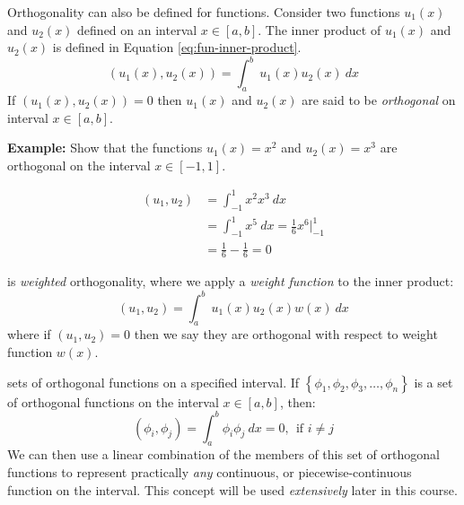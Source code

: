 Orthogonality can also be defined for functions. Consider two functions $u_1(x)$ and $u_2(x)$ defined on an interval $x\in[a,b]$.  The inner product of $u_1(x)$ and $u_2(x)$ is defined in Equation \ref{eq:fun-inner-product}.
\begin{equation}
\left(u_1(x),u_2(x)\right) = \int_{a}^{b} \ u_1(x)u_2(x) \ dx
\label{eq:fun-inner-product}
\end{equation}
If $\left(u_1(x),u_2(x)\right)=0$ then $u_1(x)$ and $u_2(x)$ are said to be \emph{orthogonal} on interval $x\in[a,b]$.

\vspace{0.5cm}

\noindent\textbf{Example:} Show that the functions $u_1(x)=x^2$ and $u_2(x)=x^3$ are orthogonal on the interval $x \in[-1,1]$.

\vspace{0.5cm}

\begin{align*}
\left(u_1,u_2\right) &= \int_{-1}^{1} x^2 x^3 \ dx \\
&= \int_{-1}^1 x^5 \ dx = \frac{1}{6}x^6\Bigr|_{-1}^{1} \\
&=\frac{1}{6} - \frac{1}{6} = 0
\end{align*}

 is \emph{weighted} orthogonality, where we apply a \emph{weight function} to the inner product:
\begin{equation}
\left(u_1,u_2\right) = \int_a^b \ u_1(x)u_2(x)w(x) \ dx
\label{eq:weighted-inner-product}
\end{equation}
where if $\left(u_1,u_2\right)=0$ then we say they are orthogonal with respect to weight function $w(x)$.

 sets of orthogonal functions on a specified interval.  If $\left\{ \phi_1,\phi_2,\phi_3,\dots,\phi_n\right\}$ is a set of orthogonal functions on the interval $x\in[a,b]$, then:
\begin{equation*}
\left(\phi_i, \phi_j\right) = \int_{a}^{b} \phi_i \phi_j \ dx = 0, \ \ \text{if } i \ne j
\end{equation*}
We can then use a linear combination of the members of this set of orthogonal functions to represent practically \emph{any} continuous, or piecewise-continuous function on the interval.  This concept will be used \emph{extensively} later in this course.

